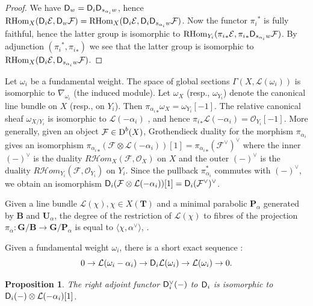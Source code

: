 \documentclass[sn-mathphys-num]{sn-jnl}%
\newcommand{\Oo}{\mathcal O}
\newcommand{\Ff}{\mathcal F}
\newcommand{\Ee}{\mathcal E}
\newcommand{\Ll}{\mathcal L}
\newcommand*{\Dd}{\mathop{\mathrm D\kern0pt}\nolimits}
\newcommand*{\RHom}{\mathop{\mathrm {RHom}}\nolimits}
\newcommand{\sd}{\sf D}
\newcommand{\bg}{\mathbf G}
\newcommand{\fb}{\mathbf B}
\newcommand{\bt}{\mathbf T}
\newcommand{\bp}{\mathbf P}
\newcommand{\bu}{\mathbf U}
\newtheorem{proposition}[theorem]{Proposition}
\theoremstyle{definition}
\begin{document}
\begin{proof}
We have ${\sf D}_w={\sf D}_i{\sf D}_{s_{\alpha _i}w}$, hence $\RHom _X({\sf D}_i\Ee,{\sf D}_w\Ff)=\RHom _X({\sf D}_i\Ee,{\sf D}_i{\sf D}_{s_{\alpha _i}w}\Ff)$. Now the functor ${\pi _i}^{\ast}$ is fully faithful, hence the latter group is isomorphic to $\RHom _{Y_i}({\pi _i}_{\ast}\Ee,{\pi _i}_{\ast}{\sf D}_{s_{\alpha _i}w}\Ff)$. By adjunction $({\pi _i}^{\ast},{\pi _i}_{\ast})$ we see that the latter group is isomorphic to $\RHom _X({\sf D}_i\Ee,{\sf D}_{s_{\alpha _i}w}\Ff)$.
\end{proof}

Let $\omega _i$ be a fundamental weight. The space of global sections $\Gamma (X,\Ll ({\omega _i}))$ is isomorphic to $\nabla _{\omega _i}$ (the induced module). Let $\omega _X$ (resp., $\omega _{Y_i}$) denote the canonical line bundle on $X$ (resp., on $Y_i$). Then ${\pi _{\alpha _i}}_{\ast}\omega _{X}=\omega _{Y_i}[-1]$. The relative canonical sheaf $\omega _{X/Y_i}$ is isomorphic to $\Ll (-\alpha _i)$ \cite[Lemme 6]{Dem}, and hence ${\pi _i}_{\ast}\Ll ({-\alpha _i})=\Oo _{Y_i}[-1]$. More generally, given an object $\Ff \in \Dd ^b(X)$, Grothendieck duality for the morphism ${\pi _{\alpha _i}}$ gives an isomorphism ${\pi _{\alpha _i}}_{\ast}(\Ff \otimes \Ll (-\alpha _i))[1]={\pi _{\alpha _i}}_{\ast}(\Ff ^{\vee})^{\vee}$ where the inner $(-)^{\vee}$ is the duality $R{\mathcal Hom}_X(\Ff ,\Oo _X)$ on $X$ and the outer $(-)^{\vee}$ is the duality $R{\mathcal Hom}_{Y_i}(\Ff ,\Oo _{Y_i})$ on $Y_i$. Since the pullback ${\pi _{\alpha _i}^{\ast}}$ commutes with $(-)^{\vee}$, we obtain 
an isomorphism ${\sd }_i(\Ff \otimes \Ll (-\alpha _i))[1]={\sd }_i(\Ff ^{\vee})^{\vee}$.

Given a line bundle $\Ll (\chi), \chi \in X({\bt})$ and a minimal parabolic ${\bp}_{\alpha}$ generated by $\fb$ and $\bu_{\alpha}$,
the degree of the restriction of $\Ll (\chi)$ to fibres of the projection $\pi _{\alpha}:{ \bg}/{\fb}\rightarrow { \bg}/{\bp}_{\alpha}$ is equal to $\langle \chi, \alpha ^{\vee}\rangle$, \cite[Lemme 2]{Demres}.

Given a fundamental weight $\omega _i$, there is a short exact sequence \cite[Section 3]{Dem}:
\begin{equation}\label{eq:Demazureses}
0\rightarrow \Ll ({\omega _i-\alpha _i})\rightarrow {\sd}_i\Ll ({\omega _i})\rightarrow \Ll ({\omega _i})\rightarrow 0.
\end{equation}

\begin{proposition}\label{prop:rightadjD_i}
The right adjoint functor ${\sd }_i^{\vee}(-)$ to ${\sd }_i$ is isomorphic to ${\sd }_i(-)\otimes \Ll (-{\alpha _i})[1]$.
\end{proposition}
\end{document}
